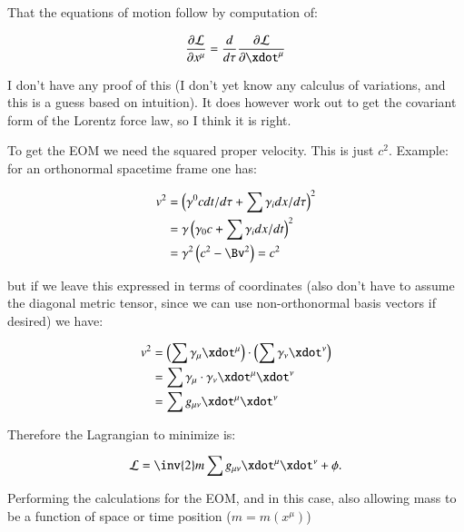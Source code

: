 That the equations of motion follow by computation of:

\begin{equation}
\PD{x^{\mu}}{\LL} = \frac{d}{d\tau} \PD{\xdot^{\mu}}{\LL}
\end{equation}

I don't have any proof of this (I don't yet know any calculus of variations, and this is a guess based on intuition).  It does however work out to get the covariant form of the Lorentz force law, so I think it is right.

To get the EOM we need the squared proper velocity.  This is just $c^2$.  Example: for an orthonormal spacetime frame one has:

\begin{align*}
v^2 &= 
\left(\gamma^0 c dt/d\tau + \sum \gamma_i dx/d\tau\right)^2  \\
&= \gamma \left(\gamma_0 c + \sum \gamma_i dx/dt\right)^2 \\
&= \gamma^2 \left(c^2 - \Bv^2\right) = c^2
\end{align*}

but if we leave this expressed in terms of coordinates (also don't have to assume the diagonal metric tensor, since we can use non-orthonormal basis vectors if desired) we have:

\begin{align*}
v^2 
&= \left(\sum \gamma_{\mu} \xdot^{\mu}\right) \cdot \left(\sum \gamma_{\nu} \xdot^{\nu}\right) \\
&= \sum \gamma_{\mu} \cdot \gamma_{\nu} \xdot^{\mu} \xdot^{\nu} \\
&= \sum g_{\mu\nu} \xdot^{\mu} \xdot^{\nu}
\end{align*}

Therefore the Lagrangian to minimize is:

\begin{equation}
\LL = \inv{2} m \sum g_{\mu\nu} \xdot^{\mu} \xdot^{\nu} + \phi.
\end{equation}

Performing the calculations for the EOM, and in this case, also allowing mass to be a function of space or time position ($m = m(x^{\mu})$)

